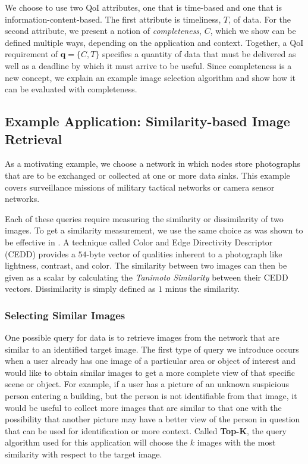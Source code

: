 We choose to use two QoI attributes, one that is time-based and one that is information-content-based.  The first attribute is timeliness, $T$, of data.  For the second attribute, we present a notion of \emph{completeness}, $C$, which we show can be defined multiple ways, depending on the application and context.  Together, a QoI requirement of $\mathbf{q} = \{C,T\}$ specifies a quantity of data that must be delivered as well as a deadline by which it must arrive to be useful.  Since completeness is a new concept, we explain an example image selection algorithm and show how it can be evaluated with completeness.

\subsection{Example Application: Similarity-based Image Retrieval}

As a motivating example, we choose a network in which nodes store photographs that are to be exchanged or collected at one or more data sinks.  This example covers surveillance missions of military tactical networks or camera sensor networks.  

Each of these queries require measuring the similarity or dissimilarity of two images.  To get a similarity measurement, we use the same choice as was shown to be effective in \cite{mediascope}.  A technique called Color and Edge Directivity Descriptor (CEDD) \cite{2008cedd} provides a $54$-byte vector of qualities inherent to a photograph like lightness, contrast, and color.  The similarity between two images can then be given as a scalar by calculating the \emph{Tanimoto Similarity} \cite{tanimoto} between their CEDD vectors.  Dissimilarity is simply defined as $1$ minus the similarity.

\subsubsection{Selecting Similar Images}
One possible query for data is to retrieve images from the network that are similar to an identified target image.
The first type of query we introduce occurs when a user already has one image of a particular area or object of interest and would like to obtain similar images to get a more complete view of that specific scene or object.  
For example, if a user has a picture of an unknown suspicious person entering a building, but the person is not identifiable from that image, it would be useful to collect more images that are similar to that one with the possibility that another picture may have a better view of the person in question that can be used for identification or more context.  Called {\bf Top-K}, the query algorithm used for this application will choose the $k$ images with the most similarity with respect to the target image.  

